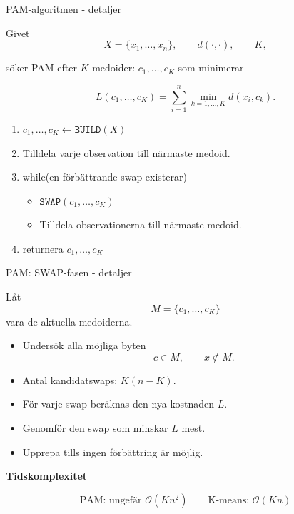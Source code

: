 \documentclass[10pt,english]{beamer}
\begin{document}
\begin{frame}{PAM-algoritmen - detaljer}

    Givet
    \[
        X=\{x_1,\ldots,x_n\},
        \qquad
        d(\cdot,\cdot),
        \qquad
        K,
    \]

    söker PAM efter $K$ medoider: $c_1,\ldots,c_K$ som minimerar

    \[
        L(c_1,\ldots,c_K)
        =
        \sum_{i=1}^{n}
        \min_{k=1,\ldots,K}
        d(x_i,c_k).
    \]

\begin{enumerate}
    \item $c_1,\ldots,c_K \leftarrow \texttt{BUILD}(X)$

    \item Tilldela varje observation till närmaste medoid.

    \item while(en förbättrande swap existerar)
    \begin{itemize}
        \item $\texttt{SWAP}(c_1,\ldots,c_K)$
        \item Tilldela observationerna till närmaste medoid.
    \end{itemize}

    \item returnera $c_1,\ldots,c_K$
\end{enumerate}
\end{frame}

\begin{frame}{PAM: SWAP-fasen - detaljer}

    Låt
    \[
        M=\{c_1,\ldots,c_K\}
    \]
    vara de aktuella medoiderna.

    \begin{itemize}
        \item Undersök alla möjliga byten
        \[
            c \in M,
            \qquad
            x \notin M.
        \]

        \item Antal kandidatswaps: $K(n-K).$

        \item För varje swap beräknas den nya kostnaden $L$.

        \item Genomför den swap som minskar $L$ mest.

        \item Upprepa tills ingen förbättring är möjlig.
    \end{itemize}

    \vspace{0.2cm}

    \textbf{Tidskomplexitet}

    \[
        \text{PAM: ungefär } \mathcal{O}(Kn^2)
        \qquad
        \text{K-means: } \mathcal{O}(Kn)
    \]

\end{frame}
\end{document}
